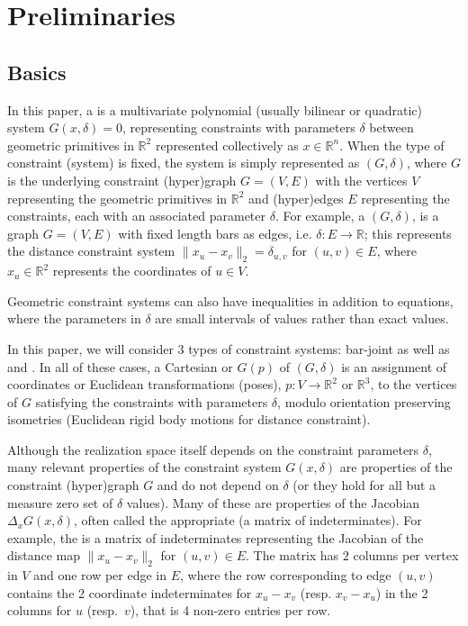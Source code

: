 \section{Preliminaries}
\label{sec:prelim}
%
\subsection{Basics}
%
In this paper, a  is a multivariate
polynomial (usually bilinear or quadratic) system $G(x,\delta)=0$,
representing constraints with parameters $\delta$ between geometric
primitives  in $\mathbb{R}^2$ represented collectively as $x\in
\mathbb{R}^n$.
%
When the type of constraint (system) is fixed, the system is simply
represented as $(G,\delta)$, where $G$ is the underlying constraint
(hyper)graph $G = (V,E)$ with the vertices $V$ representing the
geometric primitives in $\mathbb{R}^2$ and (hyper)edges $E$
representing the constraints, each with an associated parameter
$\delta$.
%
For example, a  $(G,\delta)$, is a
graph $G=(V,E)$ with fixed length bars as edges, i.e. $\delta: E
\rightarrow \mathbb{R}$; this represents the distance constraint
system $\| x_u -x_v \|_2 = \delta_{u,v}$ for  $(u,v) \in E$, where
$x_u \in \mathbb{R}^2$ represents the coordinates of $u\in V$.

\noindent
\note Geometric constraint systems can also have
inequalities in addition to equations, where the parameters in $\delta$ are small intervals of
values rather than exact values.

In this paper, we will consider 3 types of constraint systems:
bar-joint as well as  and .
In all of these cases, a Cartesian  or 
$G(p)$ of $(G,\delta)$ is an assignment of coordinates or Euclidean
transformations (poses), $p: V \rightarrow \mathbb{R}^2$ or
$\mathbb{R}^3$, to the vertices of $G$ satisfying the constraints with
parameters $\delta$, modulo orientation preserving isometries
(Euclidean rigid body motions for distance constraint).

Although the realization space itself depends on the constraint
parameters $\delta$, many relevant  properties of the
constraint system $G(x,\delta)$ are properties of the constraint
(hyper)graph $G$ and do not depend on $\delta$ (or they hold for all
but a measure zero set of $\delta$ values). Many of these are
properties of the Jacobian $\Delta_x G(x,\delta)$, often called the
appropriate  (a matrix of indeterminates).
For example, the  is a matrix of indeterminates representing the Jacobian of the
distance map $\| x_u -x_v \|_2$  for $(u,v) \in E$. The matrix has $2$
columns per vertex in $V$ and one row per edge in $E$, where the row
corresponding to edge $(u,v)$ contains the 2 coordinate indeterminates
for $x_u -x_v$ (resp. $x_v-x_u$) in the 2 columns for $u$ (resp.\
$v$), that is 4 non-zero entries per row.


